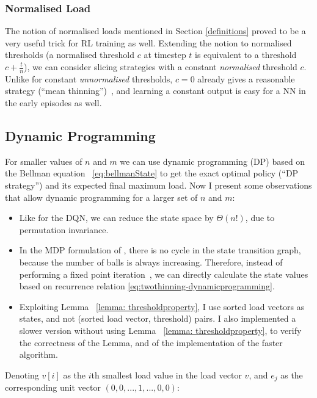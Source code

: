 \subsubsection{Normalised Load}

The notion of normalised loads mentioned in Section \ref{definitions} proved to be a very useful trick for RL training as well. Extending the notion to normalised thresholds (a normalised threshold $c$ at timestep $t$ is equivalent to a threshold $c+\frac{t}{n}$), we can consider slicing strategies with a constant \textit{normalised} threshold $c$. Unlike for constant \textit{unnormalised} thresholds, $c=0$ already gives a reasonable strategy (``mean thinning'')~\cite{los2022cachingpackingthinningtwinning}, and learning a constant output is easy for a NN in the early episodes as well.


\subsection{Dynamic Programming}


For smaller values of $n$ and $m$ we can use dynamic programming (DP) based on the Bellman equation ~\ref{eq:bellmanState} to get the exact optimal policy (``DP strategy'') and its expected final maximum load. Now I present some observations that allow dynamic programming for a larger set of $n$ and $m$:


\begin{itemize}
    \item 
    Like for the DQN, we can reduce the state space by $\Theta(n!)$, due to permutation invariance.
    \item
    In the MDP formulation of \TwoThinning, there is no cycle in the state transition graph, because the number of balls is always increasing. Therefore, instead of performing a fixed point iteration~\cite{rhoades1991fixedpointiteration}, we can directly calculate the state values based on recurrence relation \ref{eq:twothinning-dynamicprogramming}.
    \item
    Exploiting Lemma ~\ref{lemma: thresholdproperty}, I use sorted load vectors as states, and not (sorted load vector, threshold) pairs. I also implemented a slower version without using Lemma ~\ref{lemma: thresholdproperty}, to verify the correctness of the Lemma, and of the implementation of the faster algorithm.
\end{itemize}


Denoting $v[i]$ as the $i$th smallest load value in the load vector $v$, and $e_j$ as the corresponding unit vector $(0, 0, ... , 1, ..., 0, 0)$: 

